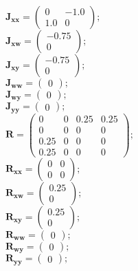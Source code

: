 \documentclass[11pt, oneside]{article}      %
\begin{document}
%
\\
%
$ \mathbf{J_{xx}} = \left(\begin{array}{cc}0 & -1.0\\1.0 & 0\end{array}\right) ; $ 
%
\\
%
$ \mathbf{J_{xw}} = \left(\begin{array}{c}-0.75\\0\end{array}\right) ; $ 
%
\\
%
$ \mathbf{J_{xy}} = \left(\begin{array}{c}-0.75\\0\end{array}\right) ; $ 
%
\\
%
$ \mathbf{J_{ww}} = \left(\begin{array}{c}0\end{array}\right) ; $ 
%
\\
%
$ \mathbf{J_{wy}} = \left(\begin{array}{c}0\end{array}\right) ; $ 
%
\\
%
$ \mathbf{J_{yy}} = \left(\begin{array}{c}0\end{array}\right) ; $ 
%
\\
%
$ \mathbf{R} = \left(\begin{array}{cccc}0 & 0 & 0.25 & 0.25\\0 & 0 & 0 & 0\\0.25 & 0 & 0 & 0\\0.25 & 0 & 0 & 0\end{array}\right) ; $ 
%
\\
%
$ \mathbf{R_{xx}} = \left(\begin{array}{cc}0 & 0\\0 & 0\end{array}\right) ; $ 
%
\\
%
$ \mathbf{R_{xw}} = \left(\begin{array}{c}0.25\\0\end{array}\right) ; $ 
%
\\
%
$ \mathbf{R_{xy}} = \left(\begin{array}{c}0.25\\0\end{array}\right) ; $ 
%
\\
%
$ \mathbf{R_{ww}} = \left(\begin{array}{c}0\end{array}\right) ; $ 
%
\\
%
$ \mathbf{R_{wy}} = \left(\begin{array}{c}0\end{array}\right) ; $ 
%
\\
%
$ \mathbf{R_{yy}} = \left(\begin{array}{c}0\end{array}\right) ; $ 
%
\\
%
\end{document}
